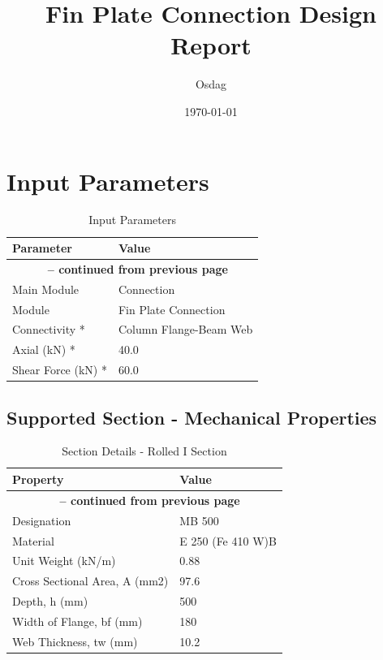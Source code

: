 \documentclass[12pt]{article}
\title{\textbf{Fin Plate Connection Design Report}}
\author{Osdag}
\date{\today}
\begin{document}
\maketitle




\tableofcontents
\newpage



\listoffigures
\newpage



\listoftables
\newpage


\section{Input Parameters}

\begin{longtable}{ll}
\caption{Input Parameters}
\label{tab:input}
Parameter & Value \\ \hline
\endfirsthead
\multicolumn{2}{c}{{\bfseries \tablename\ \thetable{} -- continued from previous page}} \\
\endhead
\endfoot
\endlastfoot
Main Module & Connection \\
\hline
Module & Fin Plate Connection \\
\hline
Connectivity * & Column Flange-Beam Web \\
\hline
Axial (kN) * & 40.0 \\
\hline
Shear Force (kN) * & 60.0 \\
\hline
\end{longtable}

\FloatBarrier

\subsection{Supported Section - Mechanical Properties}

\begin{longtable}{ll}
\caption{Section Details - Rolled I Section}
\label{tab:section-details}
\cellcolor{OsdagGreen} Property & \cellcolor{OsdagGreen} Value \\ \hline
\endfirsthead
\multicolumn{2}{c}{{\bfseries \tablename\ \thetable{} -- continued from previous page}} \\
\endhead
\endfoot
\endlastfoot
Designation & MB 500 \\
\hline
Material & E 250 (Fe 410 W)B \\
\hline
Unit Weight (kN/m) & 0.88 \\
\hline
Cross Sectional Area, A (mm2) & 97.6 \\
\hline
Depth, h (mm) & 500 \\
\hline
Width of Flange, bf (mm) & 180 \\
\hline
Web Thickness, tw (mm) & 10.2 \\
\hline
\end{longtable}
\end{document}
